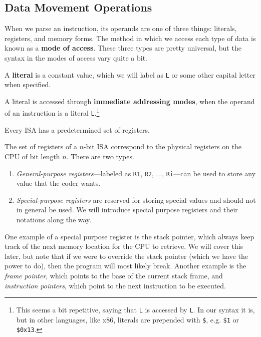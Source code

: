 \subsection{Data Movement Operations} 

  When we parse an instruction, its operands are one of three things: literals, registers, and memory forms. The method in which we access each type of data is known as a \textbf{mode of access}. These three types are pretty universal, but the syntax in the modes of access vary quite a bit. 

  \begin{definition}[Literals]
    A \textbf{literal} is a constant value, which we will label as \texttt{L} or some other capital letter when specified. 
  \end{definition}

  \begin{definition}
    A literal is accessed through \textbf{immediate addressing modes}, when the operand of an instruction is a literal \texttt{L}.\footnote{This seems a bit repetitive, saying that \texttt{L} is accessed by \texttt{L}. In our syntax it is, but in other languages, like x86, literals are prepended with \texttt{\$}, e.g. \texttt{\$1} or \texttt{\$0x13}.} 
  \end{definition}

  Every ISA has a predetermined set of registers. 

  \begin{definition}[Registers]
    The set of registers of a $n$-bit ISA correspond to the physical registers on the CPU of bit length $n$. There are two types. 
    \begin{enumerate}
      \item \textit{General-purpose registers}---labeled as \texttt{R1}, \texttt{R2}, ..., \texttt{Ri}---can be used to store any value that the coder wants. 
      \item \textit{Special-purpose registers} are reserved for storing special values and should not in general be used. We will introduce special purpose registers and their notations along the way. 
    \end{enumerate}
  \end{definition}

  One example of a special purpose register is the stack pointer, which always keep track of the next memory location for the CPU to retrieve. We will cover this later, but note that if we were to override the stack pointer (which we have the power to do), then the program will most likely break. Another example is the \textit{frame pointer}, which points to the base of the current stack frame, and \textit{instruction pointers}, which point to the next instruction to be executed. 

